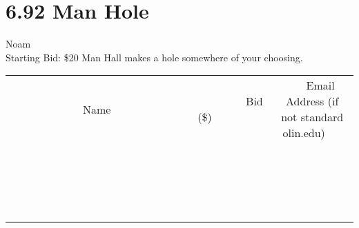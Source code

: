 \documentclass[11pt]{article}
\begin{document}
\section*{6.92 Man Hole}
Noam
\\
Starting Bid: \$20
\newline
Man Hall makes a hole somewhere of your choosing.
\\[3ex]
\begin{tabular}{c c c}
~~~~~~~~~~~~~Name~~~~~~~~~~~~~ & ~~~~~~~~~Bid (\$)~~~~~~~~~  & ~~~Email Address (if not standard olin.edu)~~~\\
 & & \\
\hline
 & & \\
\hline
 & & \\
\hline
 & & \\
\hline
 & & \\
\hline
 & & \\
\hline
 & & \\
\hline
 & & \\
\hline
 & & \\
\hline
 & & \\
\hline
 & & \\
\hline
 & & \\
\hline
 & & \\
\hline
 & & \\
\hline
 & & \\
\hline
 & & \\
\hline
 & & \\
\hline
 & & \\
\hline
 & & \\
\hline
\end{tabular}
\newpage
\end{document}
